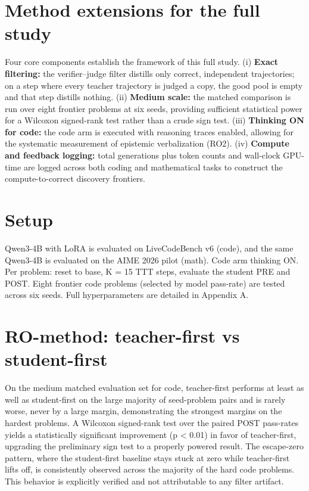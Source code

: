 \documentclass[12pt,a4paper]{report}
\begin{document}
\section{Method extensions for the full study}\label{method-extensions-for-the-full-study}

Four core components establish the framework of this full study. (i) \textbf{Exact filtering:} the verifier--judge filter distills only correct, independent trajectories; on a step where every teacher trajectory is judged a copy, the good pool is empty and that step distills nothing. (ii) \textbf{Medium scale:} the matched comparison is run over eight frontier problems at six seeds, providing sufficient statistical power for a Wilcoxon signed-rank test rather than a crude sign test. (iii) \textbf{Thinking ON for code:} the code arm is executed with reasoning traces enabled, allowing for the systematic measurement of epistemic verbalization (RO2). (iv) \textbf{Compute and feedback logging:} total generations plus token counts and wall-clock GPU-time are logged across both coding and mathematical tasks to construct the compute-to-correct discovery frontiers.

\section{Setup}\label{setup}

Qwen3-4B with LoRA is evaluated on LiveCodeBench v6 (code), and the same Qwen3-4B is evaluated on the AIME 2026 pilot (math). Code arm thinking ON. Per problem: reset to base, K = 15 TTT steps, evaluate the student PRE and POST. Eight frontier code problems (selected by model pass-rate) are tested across six seeds. Full hyperparameters are detailed in Appendix A.

\section{RO-method: teacher-first vs student-first}\label{rq-method-teacher-first-vs-student-first}

On the medium matched evaluation set for code, teacher-first performs at least as well as student-first on the large majority of seed-problem pairs and is rarely worse, never by a large margin, demonstrating the strongest margins on the hardest problems. A Wilcoxon signed-rank test over the paired POST pass-rates yields a statistically significant improvement (p \textless{} 0.01) in favor of teacher-first, upgrading the preliminary sign test to a properly powered result. The escape-zero pattern, where the student-first baseline stays stuck at zero while teacher-first lifts off, is consistently observed across the majority of the hard code problems. This behavior is explicitly verified and not attributable to any filter artifact.
\end{document}
